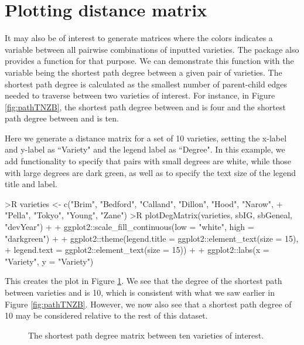 \documentclass[article,shortnames]{jss}
\begin{document}
\section{Plotting distance matrix}
\label{pdm}

It may also be of interest to generate matrices where the colors indicates a variable between all pairwise combinations of inputted varieties. The package  also provides a function  for that purpose. We can demonstrate this function with the variable being the shortest path degree between a given pair of varieties. The shortest path degree is calculated as the smallest number of parent-child edges needed to traverse between two varieties of interest. For instance, in Figure \ref{fig:pathTNZB}, the shortest path degree between  and  is four and the shortest path degree between  and  is ten.

Here we generate a distance matrix for a set of 10 varieties, setting the x-label and y-label as ``Variety" and the legend label as ``Degree". In this example, we add  functionality to specify that pairs with small degrees are white, while those with large degrees are dark green, as well as to specify the text size of the legend title and label.

\begin{Code}
>R varieties <- c("Brim", "Bedford", "Calland", "Dillon", "Hood", "Narow",
+    "Pella", "Tokyo", "Young", "Zane")
>R plotDegMatrix(varieties, sbIG, sbGeneal, "devYear") +
+    ggplot2::scale_fill_continuous(low = "white", high = "darkgreen") +
+    ggplot2::theme(legend.title = ggplot2::element_text(size = 15),
+    legend.text = ggplot2::element_text(size = 15)) +
+    ggplot2::labs(x = "Variety", y = "Variety")
\end{Code}

This creates the plot in Figure \ref{fig:degMatrix}. We see that the degree of the shortest path between varieties  and  is 10, which is consistent with what we saw earlier in Figure \ref{fig:pathTNZB}. However, we now also see that a shortest path degree of 10 may be considered relative to the rest of this dataset.

\begin{figure}[h]
    \centering
    \caption{The shortest path degree matrix between ten varieties of interest.}
    \label{fig:degMatrix}
\end{figure}
\end{document}
